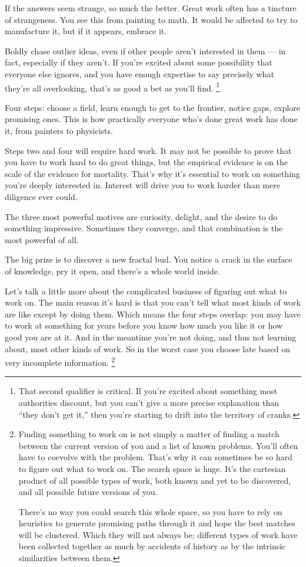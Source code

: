 \documentclass[12pt]{book}
\begin{document}
If the answers seem strange, so much the better. Great work often has a
tincture of strangeness. You see this from painting to math. It would be
affected to try to manufacture it, but if it appears, embrace it.

Boldly chase outlier ideas, even if other people aren't interested in
them --- in fact, especially if they aren't. If you're excited about
some possibility that everyone else ignores, and you have enough
expertise to say precisely what they're all overlooking, that's as good
a bet as you'll find. \footnote{That second qualifier is critical. If you're excited about
something most authorities discount, but you can't give a more precise
explanation than ``they don't get it,'' then you're starting to drift
into the territory of cranks.}

Four steps: choose a field, learn enough to get to the frontier, notice
gaps, explore promising ones. This is how practically everyone who's
done great work has done it, from painters to physicists.

Steps two and four will require hard work. It may not be possible to
prove that you have to work hard to do great things, but the empirical
evidence is on the scale of the evidence for mortality. That's why it's
essential to work on something you're deeply interested in. Interest
will drive you to work harder than mere diligence ever could.

The three most powerful motives are curiosity, delight, and the desire
to do something impressive. Sometimes they converge, and that
combination is the most powerful of all.

The big prize is to discover a new fractal bud. You notice a crack in
the surface of knowledge, pry it open, and there's a whole world inside.

Let's talk a little more about the complicated business of figuring out
what to work on. The main reason it's hard is that you can't tell what
most kinds of work are like except by doing them. Which means the four
steps overlap: you may have to work at something for years before you
know how much you like it or how good you are at it. And in the meantime
you're not doing, and thus not learning about, most other kinds of work.
So in the worst case you choose late based on very incomplete
information. \footnote{Finding something to work on is not simply a matter of finding a
match between the current version of you and a list of known problems.
You'll often have to coevolve with the problem. That's why it can
sometimes be so hard to figure out what to work on. The search space is
huge. It's the cartesian product of all possible types of work, both
known and yet to be discovered, and all possible future versions of you.

There's no way you could search this whole space, so you have to rely on
heuristics to generate promising paths through it and hope the best
matches will be clustered. Which they will not always be; different
types of work have been collected together as much by accidents of
history as by the intrinsic similarities between them.}
\end{document}
